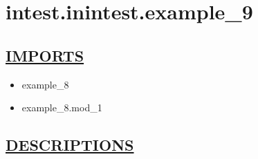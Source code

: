 \chapter*{intest.inintest.example\_9}
\hypertarget{ecldoc:toc:intest.inintest.example_9}{}

\section*{\underline{IMPORTS}}
\begin{itemize}
\item example\_8
\item example\_8.mod\_1
\end{itemize}

\section*{\underline{DESCRIPTIONS}}
